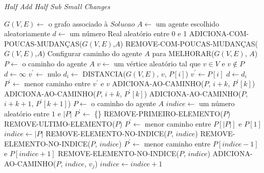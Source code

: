 \begin{algorithm}                   %
	\caption{\textit{Half Add Half Sub Small Changes}}          %
	\label{small_changes}                           %
	\begin{algorithmic}[1]                   %
		\newline
		\State $G(V,E) \gets $ o grafo associado à $Solucao$
		\State $A \gets $ um agente escolhido aleatoriamente
		\State $d \gets $ um número Real aleatório entre 0 e 1
			\State ADICIONA-COM-POUCAS-MUDANÇAS($G(V,E)$,$A$)
		\Else
			\State REMOVE-COM-POUCAS-MUDANÇAS($G(V,E)$,$A$)
		\EndIf
		\State Configurar caminho do agente $A$ para MELHORAR($G(V,E)$, $A$)
		\EndProcedure
		\State $P \gets $ o caminho do agente $A$
		\State $v \gets $ um vértice aleatório tal que $v \in V$ e $v \notin P$
		\State $d \gets \infty$
		\State $v^{\prime} \gets $ nulo
			$d_{i} \gets $ DISTANCIA($G(V,E)$, $v$, $P[i]$)
				$v^{\prime} \gets P[i]$
				\State $d \gets d_{i}$
			\EndIf
		\EndFor
		\State $P^{\prime} \gets $ menor caminho entre $v^{\prime}$ e $v$
			ADICIONA-AO-CAMINHO($P$, $i + k$, $P^{\prime}[k]$)
			\State ADICIONA-AO-CAMINHO($P$, $i + k$, $P^{\prime}[k]$)
		\EndFor
		\State ADICIONA-AO-CAMINHO($P$, $i + k + 1$, $P^{\prime}[k + 1]$)
		\EndProcedure
		\State $P \gets $ o caminho do agente $A$
		\State $indice \gets $ um número aleatório entre $1$ e $|P|$
		\State $P^{\prime} \gets $ \{\}
			REMOVE-PRIMEIRO-ELEMENTO($P$)
			\State REMOVE-ULTIMO-ELEMENTO($P$)
			\State $P^{\prime} \gets $ menor caminho entre $P[|P|]$ e $P[1]$
			\State $indice \gets |P|$
			\State REMOVE-ELEMENTO-NO-INDICE($P$, $indice$)
			\State REMOVE-ELEMENTO-NO-INDICE($P$, $indice$)
		\Else
			$P^{\prime} \gets $ menor caminho entre $P[indice - 1]$ e $P[indice + 1]$
			\State REMOVE-ELEMENTO-NO-INDICE($P$, $indice$)
		\EndIf
			ADICIONA-AO-CAMINHO($P$, $indice$, $v_{j}$)
			\State $indice \gets indice + 1$
		\EndFor
		\EndProcedure
	\end{algorithmic}
\end{algorithm}


